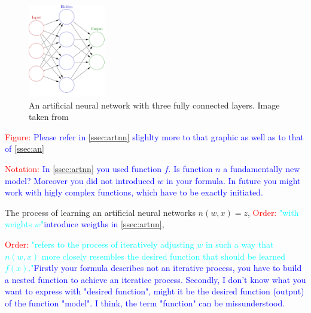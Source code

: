 \begin{figure}[ht] 
    \centering
    \includegraphics[width=0.3\textwidth]{images/figures/artificial_neural_network.png}
    \caption{An artificial neural network with three fully connected layers.
    Image taken from \parencite{2013-glosser-ann}} \label{figure_fully_connected_nn}
\end{figure} 

\textcolor{red}{Figure:} \textcolor{blue}{Please refer in \ref{ssec:artnn} slighlty more to that graphic as well as to that of \ref{ssec:an}} 

\textcolor{red}{Notation:} \textcolor{cyan}{} \textcolor{blue}{In \ref{ssec:artnn} you used function $f$. Is function $n$ a fundamentally new model? Moreover you did not introduced $w$ in your formula. In future you might work with higly complex functions, which have to be exactly initiated.}

The process of learning an artificial neural networks $n(w, x)=z$, \textcolor{red}{Order:} \textcolor{cyan}{"with weights $w$"}\textcolor{blue}{introduce weigths in \ref{ssec:artnn}}, 

\textcolor{red}{Order:} \textcolor{cyan}{"refers to the process
of iteratively adjusting $w$ in such a way that $n(w, x )$ more closely resembles the desired function
that should be learned $f(x)$."}\textcolor{blue}{Firstly your formula describes not an iterative process, you have to build a nested function to achieve an iteratice process. Secondly, I don't know what you want to express with "desired function", might it be the desired function (output) of the function "model". I think, the term "function" can be missunderstood.}

